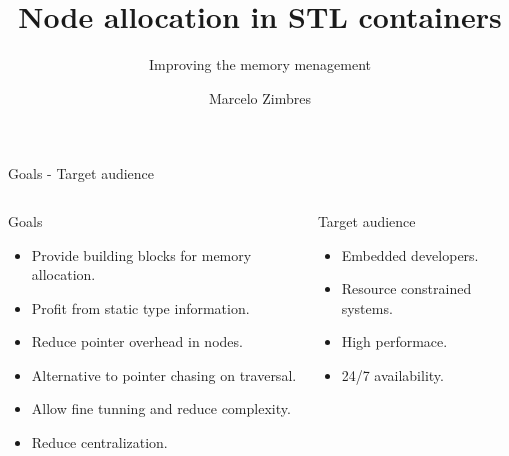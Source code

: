 \documentclass[10pt,aspectratio=169]{beamer}
\title[Node allocation in STL containers] {Node allocation in STL containers}
\subtitle[Improving the memory menagement] {Improving the memory menagement}
\author[Marcelo Zimbres] {Marcelo Zimbres}
\institute[Presentation to WG21-SG14]
{
}
\date[Magstadt - Germany] {}
\begin{document}
\begin{frame}
  \titlepage
\end{frame}






\begin{frame}{Goals - Target audience}{}
\begin{columns}
\begin{column}{0.50\textwidth}
\begin{block} {Goals}
\begin{itemize}
    \item Provide building blocks for memory allocation.
    \item Profit from static type information.
    \item Reduce pointer overhead in nodes.
    \item Alternative to pointer chasing on traversal.
    \item Allow fine tunning and reduce complexity.
    \item Reduce centralization.
\end{itemize}
\end{block}

\end{column}

\begin{column}{0.35\textwidth}
\begin{block} {Target audience}
\begin{itemize}
    \item Embedded developers.
    \item Resource constrained systems.
    \item High performace.
    \item 24/7 availability.
\end{itemize}
\end{block}
\end{column}
\end{columns}
\end{frame}
\end{document}
